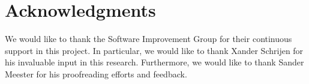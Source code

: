 \documentclass[sigconf,review, table]{acmart}
\begin{document}
\section*{Acknowledgments}
We would like to thank the Software Improvement Group for their continuous support in this project. In particular, we would like to thank Xander Schrijen for his invaluable input in this research. Furthermore, we would like to thank Sander Meester for his proofreading efforts and feedback.



\end{document}
